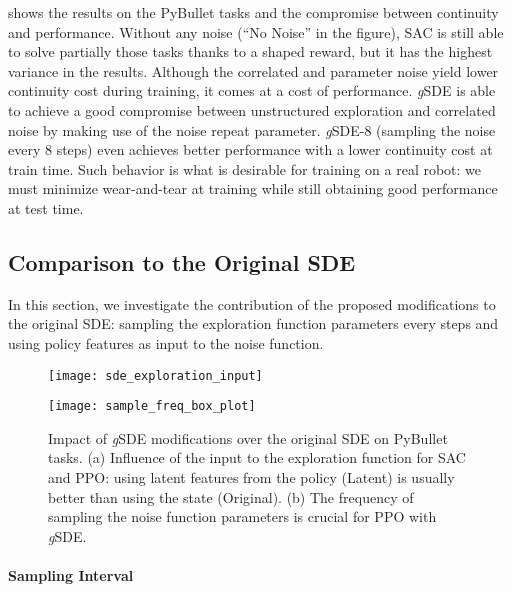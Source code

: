 \documentclass{article}
\newcommand{\SDE}{\textsc{SDE}\xspace}
\newcommand{\ourSDE}{\textit{g}\textsc{SDE}\xspace}
\newcommand{\ppo}{\textsc{PPO}\xspace}
\newcommand{\sac}{\textsc{SAC}\xspace}
\newcommand{\walker}{\textsc{Walker2D}\xspace}
\begin{document}
 shows the results on the PyBullet tasks and the compromise between continuity and performance.
Without any noise (``No Noise'' in the figure), \sac is still able to solve partially those tasks thanks to a shaped reward, but it has the highest variance in the results.
Although the correlated and parameter noise yield lower continuity cost during training, it comes at a cost of performance.
\ourSDE is able to achieve a good compromise between unstructured exploration and correlated noise by making use of the noise repeat parameter.
\ourSDE-8 (sampling the noise every 8 steps) even achieves better performance with a lower continuity cost at train time.
Such behavior is what is desirable for training on a real robot: we must minimize wear-and-tear at training while still obtaining good performance at test time.


\subsection{Comparison to the Original \SDE}
\label{sec:ablation}

In this section, we investigate the contribution of the proposed modifications to the original \SDE: sampling the exploration function parameters every  steps and using policy features as input to the noise function.


\begin{figure}[h]
  \begin{minipage}[t]{.45\linewidth}
    \centering\texttt{[image: sde\_exploration\_input]}
    \label{fig:sde-features}
  \end{minipage}
  \hfill
  \begin{minipage}[t]{.45\linewidth}
    \centering\texttt{[image: sample\_freq\_box\_plot]}
    \subcaption{Sampling interval (\ppo on \walker)}
    \label{fig:ppo-sample-freq}
  \end{minipage}
  \caption{Impact of \ourSDE modifications over the original \SDE on PyBullet tasks. (a) Influence of the input to the exploration function  for \sac and \ppo: using latent features from the policy  (Latent) is usually better than using the state  (Original). (b) The frequency of sampling the noise function parameters is crucial for \ppo with \ourSDE.}
\end{figure}

\paragraph{Sampling Interval}
\end{document}
